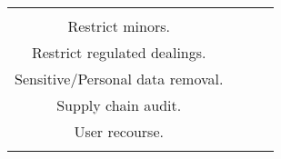 \documentclass[fleqn]{article}
\begin{document}
\begin{table}[H]
\begin{tabular}{|c|c|c|c|}
{			\textbullet\hspace{3pt} Insurance. \\ 	
			\textbullet\hspace{3pt} Restrict minors. \\ 	
			\textbullet\hspace{3pt} Restrict regulated dealings. \\ 	
			\textbullet\hspace{3pt} Sensitive/Personal data removal. \\ 	
			\textbullet\hspace{3pt} Supply chain audit. \\ 	
			\textbullet\hspace{3pt} User recourse. \\ 		 	 	 
		} \\
		\hline
	\end{tabular}
	\label{table:high_risk_plan_by_gai_risk}
\end{table}
\end{document}
